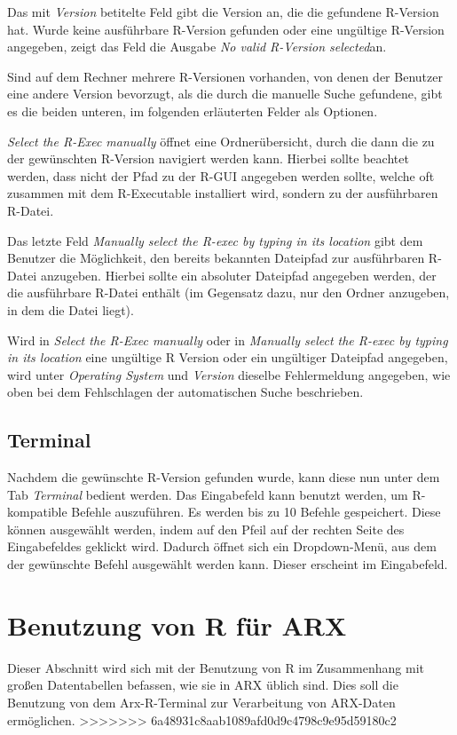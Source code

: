 \documentclass[a4paper, 12pt]{report} %
\begin{document}
Das mit \textit{Version} betitelte Feld gibt die Version an, die die gefundene R-Version hat. Wurde keine ausführbare R-Version gefunden oder eine ungültige R-Version angegeben, zeigt das Feld die Ausgabe \textit{No valid R-Version selected}an. 

Sind auf dem Rechner mehrere R-Versionen vorhanden, von denen der Benutzer eine andere Version bevorzugt, als die durch die manuelle Suche gefundene, gibt es die beiden unteren, im folgenden erläuterten Felder als Optionen. 

\textit{Select the R-Exec manually} öffnet eine Ordnerübersicht, durch die dann die zu der gewünschten R-Version navigiert werden kann. Hierbei sollte beachtet werden, dass nicht der Pfad zu der R-GUI angegeben werden sollte, welche oft zusammen mit dem R-Executable installiert wird, sondern zu der ausführbaren R-Datei.
  
Das letzte Feld \textit{Manually select the R-exec by typing in its location} gibt dem Benutzer die Möglichkeit, den bereits bekannten Dateipfad zur ausführbaren R-Datei anzugeben. Hierbei sollte ein absoluter Dateipfad angegeben werden, der die ausführbare R-Datei enthält (im Gegensatz dazu, nur den Ordner anzugeben, in dem die Datei liegt). 

Wird in \textit{Select the R-Exec manually} oder in \textit{Manually select the R-exec by typing in its location} eine ungültige R Version oder ein ungültiger Dateipfad angegeben, wird unter \textit{Operating System} und \textit{Version} dieselbe Fehlermeldung angegeben, wie oben bei dem Fehlschlagen der automatischen Suche beschrieben.

\subsection{Terminal}
Nachdem die gewünschte R-Version gefunden wurde, kann diese nun unter dem Tab \textit{Terminal} bedient werden. Das Eingabefeld kann benutzt werden, um R-kompatible Befehle auszuführen. Es werden bis zu 10 Befehle gespeichert. Diese können ausgewählt werden, indem auf den Pfeil auf der rechten Seite des Eingabefeldes geklickt wird. Dadurch öffnet sich ein Dropdown-Menü, aus dem der gewünschte Befehl ausgewählt werden kann. Dieser erscheint im Eingabefeld. 


\section{Benutzung von R für ARX }
Dieser Abschnitt wird sich mit der Benutzung von R im Zusammenhang mit großen Datentabellen befassen, wie sie in ARX üblich sind. Dies soll die Benutzung von dem Arx-R-Terminal zur Verarbeitung von ARX-Daten ermöglichen. 
>>>>>>> 6a48931c8aab1089afd0d9c4798c9e95d59180c2
\end{document}
